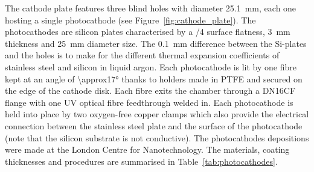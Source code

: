 \documentclass[a4paper,11pt]{article}
\begin{document}
\begin{table}[tb]
\centering
\caption[]{The table summarises the properties of the photocathode coatings tested. Note that the gold photocathode needs a $\approx$\SI{5}{nm} Ti substrate for the gold to adhere. All the depositions have been performed at the London Centre for Nanotechnology.}
    
    \smallskip
    \label{tab:photocathodes}
\end{table}

The cathode plate features three blind holes with diameter \SI{25.1}{mm}, each one hosting a single photocathode (see Figure~\ref{fig:cathode_plate}). 
The photocathodes are silicon plates characterised by a \textlambda/4 surface flatness, \SI{3}{mm} thickness and \SI{25}{mm} diameter size. 
The \SI{0.1}{mm} difference between the Si-plates and the holes is to make for the different thermal expansion coefficients of stainless steel and silicon in liquid argon. 
Each photocathode is lit by one fibre kept at an angle of \ang{\approx17} thanks to holders made in PTFE and secured on the edge of the cathode disk.  Each fibre exits the chamber through a DN16CF flange with one UV optical fibre feedthrough welded in. 
Each photocathode is held into place by two oxygen-free copper clamps which also provide the electrical connection between the stainless steel plate and the surface of the photocathode (note that the silicon substrate is not conductive). 
The photocathodes depositions were made at the London Centre for Nanotechnology. The materials, coating thicknesses and procedures are summarised in Table~\ref{tab:photocathodes}.
\end{document}
